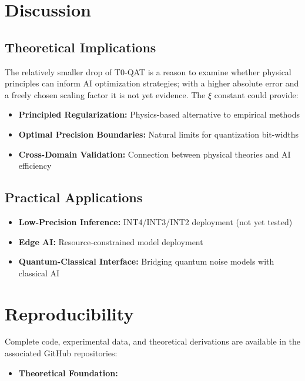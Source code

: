 	\section{Discussion}
	
	\subsection{Theoretical Implications}
	
	The relatively smaller drop of T0-QAT is a reason to examine whether physical principles can inform AI optimization strategies; with a higher absolute error and a freely chosen scaling factor it is not yet evidence. The $\xi$ constant could provide:
	
	\begin{itemize}
		\item \textbf{Principled Regularization:} Physics-based alternative to empirical methods
		\item \textbf{Optimal Precision Boundaries:} Natural limits for quantization bit-widths
		\item \textbf{Cross-Domain Validation:} Connection between physical theories and AI efficiency
	\end{itemize}
	
	\subsection{Practical Applications}
	
	\begin{itemize}
		\item \textbf{Low-Precision Inference:} INT4/INT3/INT2 deployment (not yet tested)
		\item \textbf{Edge AI:} Resource-constrained model deployment
		\item \textbf{Quantum-Classical Interface:} Bridging quantum noise models with classical AI
	\end{itemize}
	
	\section*{Reproducibility}
	
	Complete code, experimental data, and theoretical derivations are available in the associated GitHub repositories:
	
	\begin{itemize}
		\item \textbf{Theoretical Foundation:} 
	\end{itemize}
	
